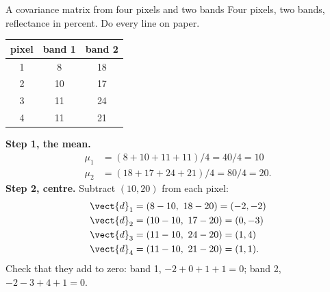 \begin{worked}[label={we:linalg:cov}]{A covariance matrix from four pixels and two bands}
Four pixels, two bands, reflectance in percent. Do every line on paper.
\begin{center}
\begin{tabular}{ccc}
\toprule
pixel & band 1 & band 2\\
\midrule
1 & 8  & 18\\
2 & 10 & 17\\
3 & 11 & 24\\
4 & 11 & 21\\
\bottomrule
\end{tabular}
\end{center}
\textbf{Step 1, the mean.}
\begin{align*}
\mu_1 &= (8 + 10 + 11 + 11)/4 = 40/4 = 10\\
\mu_2 &= (18 + 17 + 24 + 21)/4 = 80/4 = 20 .
\end{align*}
\textbf{Step 2, centre.} Subtract $(10, 20)$ from each pixel:
\begin{align*}
\vect{d}_1 &= (8-10,\ 18-20) = (-2, -2)\\
\vect{d}_2 &= (10-10,\ 17-20) = (0, -3)\\
\vect{d}_3 &= (11-10,\ 24-20) = (1, 4)\\
\vect{d}_4 &= (11-10,\ 21-20) = (1, 1).
\end{align*}
Check that they add to zero: band 1, $-2 + 0 + 1 + 1 = 0$; band 2, $-2 - 3 + 4 + 1 = 0$.


\end{worked}
